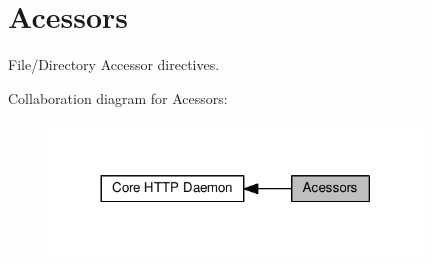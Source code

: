 \hypertarget{group__APACHE__CORE__HTTPD__ACESSORS}{}\section{Acessors}
\label{group__APACHE__CORE__HTTPD__ACESSORS}


File/\+Directory Accessor directives.  


Collaboration diagram for Acessors\+:
\nopagebreak
\begin{figure}[H]
\begin{center}
\leavevmode
\includegraphics[width=281pt]{group__APACHE__CORE__HTTPD__ACESSORS}
\end{center}
\end{figure}
